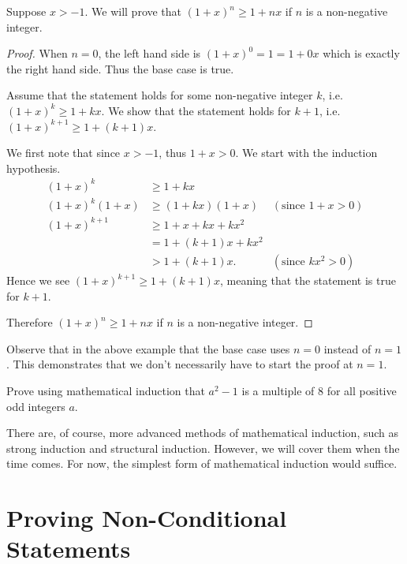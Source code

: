\begin{example}
    \setlength{\parindent}{1.5em}

    Suppose $x > -1$. We will prove that $(1+x)^n \geq 1+nx$ if $n$ is a non-negative integer.
    \begin{proof}
        When $n = 0$, the left hand side is $(1+x)^0 = 1 = 1 + 0x$ which is exactly the right hand side. Thus the base case is true.

        Assume that the statement holds for some non-negative integer $k$, i.e. $(1+x)^k \geq 1+kx$. We show that the statement holds for $k+1$, i.e. $(1+x)^{k+1} \geq 1+(k+1)x$.

        We first note that since $x>-1$, thus $1+x > 0$. We start with the induction hypothesis.
        \begin{align*}
            (1+x)^k &\geq 1+kx\\
            (1+x)^k(1+x) &\geq (1+kx)(1+x) & (\text{since }1+x > 0)\\
            (1+x)^{k+1} &\geq 1 + x + kx + kx^2\\
            &= 1+(k+1)x + kx^2\\
            &> 1+(k+1)x. & (\text{since } kx^2 > 0)
        \end{align*}
        Hence we see $(1+x)^{k+1} \geq 1+(k+1)x$, meaning that the statement is true for $k+1$.

        Therefore $(1+x)^n \geq 1+nx$ if $n$ is a non-negative integer.
    \end{proof}
\end{example}

Observe that in the above example that the base case uses $n = 0$ instead of $n = 1$. This demonstrates that we don't necessarily have to start the proof at $n = 1$.

\begin{exercise}
    Prove using mathematical induction that $a^2 - 1$ is a multiple of 8 for all positive odd integers $a$.
\end{exercise}

There are, of course, more advanced methods of mathematical induction, such as strong induction and structural induction. However, we will cover them when the time comes. For now, the simplest form of mathematical induction would suffice.

\section{Proving Non-Conditional Statements}

